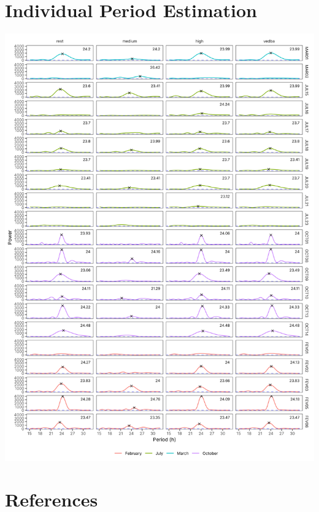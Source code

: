 \documentclass[english,msc,numbers,hidelinks]{coppe}
\begin{document}
  \hypertarget{individual-period-estimation}{%
  \chapter{Individual Period Estimation}\label{individual-period-estimation}}
  \begin{center}\includegraphics[width=22.96in]{../04_figures/periodogram/periodogram} \end{center}

  \backmatter
  
  

  \hypertarget{references}{%
  \chapter*{References}\label{references}}

  \noindent
\end{document}
